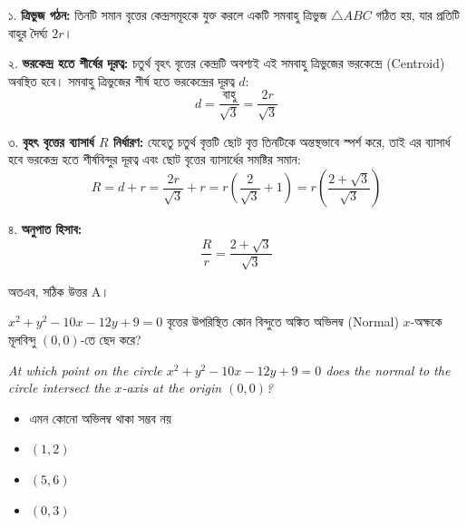 \documentclass[12pt, a4paper]{article}
\begin{document}
\begin{tcolorbox}[solutionbox={সমাধান (Solution)}]
    \noindent
    ১. \textbf{ত্রিভুজ গঠন:} 
    তিনটি সমান বৃত্তের কেন্দ্রসমূহকে যুক্ত করলে একটি সমবাহু ত্রিভুজ $\triangle ABC$ গঠিত হয়, যার প্রতিটি বাহুর দৈর্ঘ্য $2r$।
    
    \vspace{0.5em}
    ২. \textbf{ভরকেন্দ্র হতে শীর্ষের দূরত্ব:} 
    চতুর্থ বৃহৎ বৃত্তের কেন্দ্রটি অবশ্যই এই সমবাহু ত্রিভুজের ভরকেন্দ্রে (Centroid) অবস্থিত হবে। সমবাহু ত্রিভুজের শীর্ষ হতে ভরকেন্দ্রের দূরত্ব $d$:
    \[ d = \frac{\text{বাহু}}{\sqrt{3}} = \frac{2r}{\sqrt{3}} \]
    
    \vspace{0.5em}
    ৩. \textbf{বৃহৎ বৃত্তের ব্যাসার্ধ $R$ নির্ধারণ:} 
    যেহেতু চতুর্থ বৃত্তটি ছোট বৃত্ত তিনটিকে অন্তস্থভাবে স্পর্শ করে, তাই এর ব্যাসার্ধ হবে ভরকেন্দ্র হতে শীর্ষবিন্দুর দূরত্ব এবং ছোট বৃত্তের ব্যাসার্ধের সমষ্টির সমান:
    \[ R = d + r = \frac{2r}{\sqrt{3}} + r = r\left(\frac{2}{\sqrt{3}} + 1\right) = r\left(\frac{2+\sqrt{3}}{\sqrt{3}}\right) \]
    
    \vspace{0.5em}
    ৪. \textbf{অনুপাত হিসাব:} 
    \[ \frac{R}{r} = \frac{2+\sqrt{3}}{\sqrt{3}} \]
    
    \vspace{0.5em}
    অতএব, সঠিক উত্তর A।
\end{tcolorbox}

\begin{tcolorbox}[questionbox={প্রশ্ন (Question) 26}]
    \noindent
    $x^2 + y^2 - 10x - 12y + 9 = 0$ বৃত্তের উপরিস্থিত কোন বিন্দুতে অঙ্কিত অভিলম্ব (Normal) $x$-অক্ষকে মূলবিন্দু $(0, 0)$-তে ছেদ করে?
    
    \vspace{0.8em}
    \begin{english}
    \noindent\textit{\color{darkgray}
    At which point on the circle $x^2 + y^2 - 10x - 12y + 9 = 0$ does the normal to the circle intersect the $x$-axis at the origin $(0, 0)$?
    }
    \end{english}
\end{tcolorbox}

\begin{itemize}[label={}, leftmargin=1cm, itemsep=0.5em]
    \item[\textbf{A)}] এমন কোনো অভিলম্ব থাকা সম্ভব নয়
    \item[\textbf{B)}] $(1, 2)$
    \item[\textbf{C)}] $(5, 6)$
    \item[\textbf{D)}] $(0, 3)$
\end{itemize}
\end{document}
